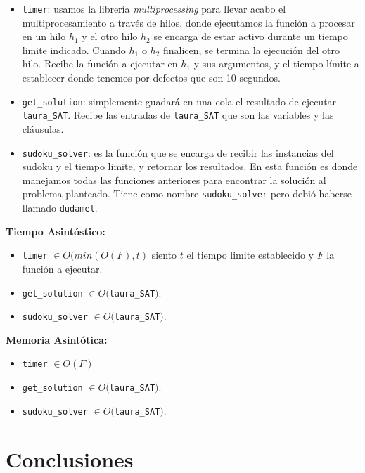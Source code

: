\documentclass[letterpaper,12pt]{article}
\begin{document}
\begin{itemize}
	\item \texttt{timer}: usamos la librería \textit{multiprocessing} para llevar acabo el multiprocesamiento a través de hilos, donde ejecutamos la función a procesar en un hilo $h_1$ y el otro hilo $h_2$ se encarga de estar activo durante un tiempo limite indicado. Cuando $h_1$ o $h_2$ finalicen, se termina la ejecuci\'on del otro hilo. Recibe la función a ejecutar en $h_1$ y sus argumentos, y el tiempo límite a establecer donde tenemos por defectos que son 10 segundos.

	\item \texttt{get\_solution}: simplemente guadará en una cola el resultado de ejecutar \texttt{laura\_SAT}. Recibe las entradas de \texttt{laura\_SAT} que son las variables y las cláusulas.

	\item \texttt{sudoku\_solver}: es la función que se encarga de recibir las instancias del sudoku y el tiempo limite, y retornar los resultados. En esta función es donde manejamos todas las funciones anteriores para encontrar la solución al problema planteado. Tiene como nombre \texttt{sudoku\_solver} pero debió haberse llamado \texttt{dudamel}. \\
\end{itemize}

\textbf{Tiempo Asintóstico:}
\begin{itemize}
	\item \texttt{timer} $\in O(min(O(F), t)$ siento $t$ el tiempo limite establecido y $F$ la funci\'on a ejecutar.
	\item \texttt{get\_solution} $\in O($\texttt{laura\_SAT}$)$.	
	\item \texttt{sudoku\_solver} $\in O($\texttt{laura\_SAT}$)$. \\
\end{itemize}

\textbf{Memoria Asintótica:}
\begin{itemize}
	\item \texttt{timer} $\in O(F)$
	\item \texttt{get\_solution} $\in O($\texttt{laura\_SAT}$)$.
	\item \texttt{sudoku\_solver} $\in O($\texttt{laura\_SAT}$)$.
\end{itemize}


\section{Conclusiones}
\end{document}

